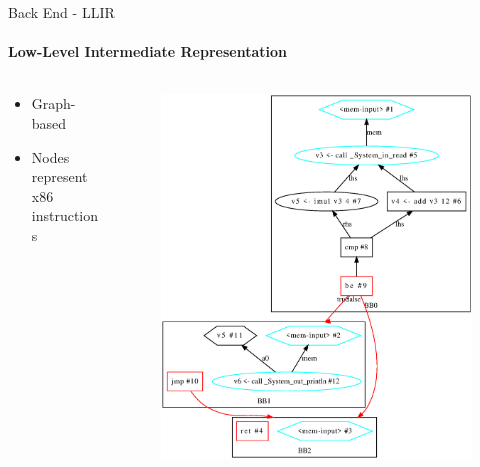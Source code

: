 \documentclass[en,16:9]{sdqbeamer}
\begin{document}
\begin{frame}{Back End - LLIR}
	\framesubtitle{Low-Level Intermediate Representation}
	
	\begin{columns}
		\begin{column}{0.2\textwidth}
			\begin{itemize}
				\item Graph-based
				\item Nodes represent x86 instructions
			\end{itemize}
		\end{column}

		\begin{column}{0.5\textwidth}
			\vspace{-3em}
			\begin{figure}
				\centering
				\includegraphics[scale=0.3]{images/llir-example}
			\end{figure}
		\end{column}
	\end{columns}
\end{frame}
\end{document}
